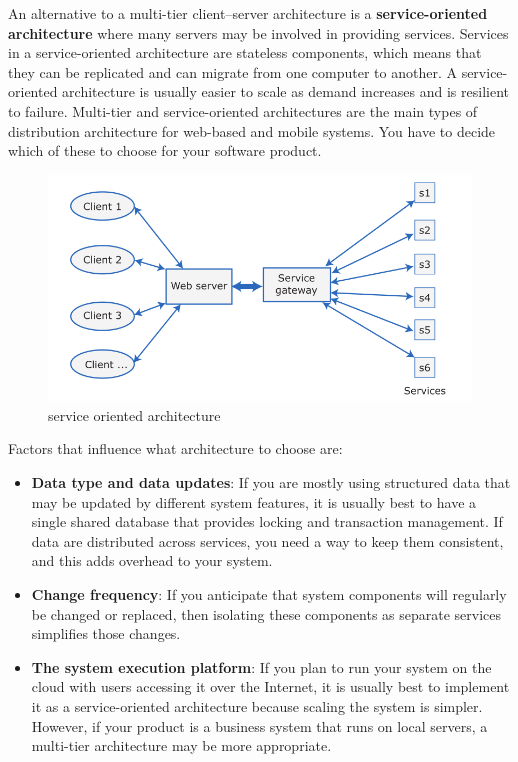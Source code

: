 An alternative to a multi-tier client–server architecture is a \textbf{service-oriented architecture} where many servers may be involved in providing services. Services in a service-oriented architecture are stateless components, which means that they can be replicated and can migrate from one computer to another. A service-oriented architecture is usually easier to scale as demand increases and is resilient to failure.
Multi-tier and service-oriented architectures are the main types of distribution architecture for web-based and mobile systems. You have to decide which of these to choose for your software product.
\begin{figure}[ht]
   \centering
   \includegraphics[width=0.5\linewidth]{images/questions/service-oriented.png}
   \caption{service oriented architecture}
   \label{fig:service oriented}
\end{figure}
Factors that influence what architecture to choose are:
\begin{itemize}
   \item \textbf{Data type and data updates}: If you are mostly using structured data that may be updated by different system features, it is usually best to have a single shared database that provides locking and transaction management. If data are distributed across services, you need a way to keep them consistent, and this adds overhead to your system.
   \item \textbf{Change frequency}: If you anticipate that system components will regularly be changed or replaced, then isolating these components as separate services simplifies those changes.
   \item \textbf{The system execution platform}: If you plan to run your system on the cloud with users accessing it over the Internet, it is usually best to implement it as a service-oriented architecture because scaling the system is simpler. However, if your product is a business system that runs on local servers, a multi-tier architecture may be more appropriate.
\end{itemize}

